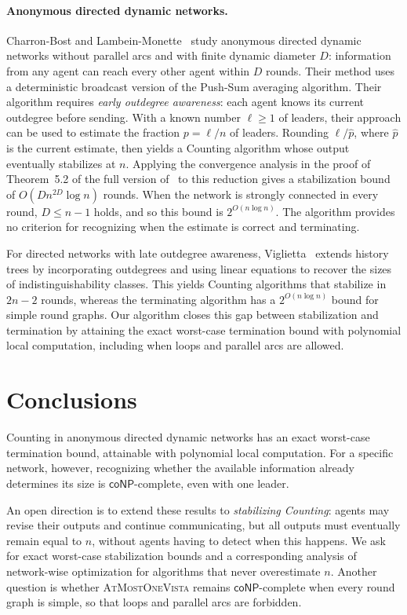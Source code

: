 \documentclass[11pt]{article}
\begin{document}
\paragraph{Anonymous directed dynamic networks.}
Charron-Bost and Lambein-Monette~\cite{CBLM24} study
anonymous directed dynamic networks without parallel arcs and with finite
dynamic diameter \(D\): information from any agent can reach every
other agent within \(D\) rounds.
Their method uses a deterministic broadcast
version of the Push-Sum averaging algorithm.%
Their algorithm requires \emph{early outdegree
awareness}: each agent knows its current outdegree before sending.
With a known number \(\ell\geq1\) of leaders, their approach can be used
to estimate the fraction \(p=\ell/n\) of leaders. Rounding
\(\ell/\widehat p\), where \(\widehat p\) is the current estimate,
then yields a Counting algorithm whose output eventually stabilizes
at \(n\). Applying the convergence analysis in the proof of
Theorem~5.2 of the full version of~\cite{CBLM24} to this reduction gives a
stabilization bound of \(O(Dn^{2D}\log n)\) rounds. When the network
is strongly connected in every round, \(D\leq n-1\) holds, and so this bound
is \(2^{O(n\log n)}\). The algorithm provides no criterion for
recognizing when the estimate is correct and terminating. 

For directed networks with late outdegree awareness, Viglietta~\cite{VIG24} extends
history trees by incorporating outdegrees and using linear equations
to recover the sizes of indistinguishability classes. This yields
Counting algorithms that stabilize in \(2n-2\) rounds, whereas the
terminating algorithm has a \(2^{O(n\log n)}\) bound for simple round
graphs. Our algorithm closes this gap between stabilization and
termination by attaining the exact worst-case termination bound with
polynomial local computation, including
when loops and parallel arcs are allowed.

\section{Conclusions}
\label{sec:conclusions}

Counting in anonymous directed dynamic networks has an exact
worst-case termination bound, attainable with polynomial local
computation. For a specific network, however,
recognizing whether the available information already determines
its size is \(\mathsf{coNP}\)-complete, even with one leader.

An open direction is to extend these results to \emph{stabilizing
Counting}: agents may revise their outputs and continue communicating,
but all outputs must eventually remain equal to \(n\), without agents
having to detect when this happens. We ask for exact worst-case
stabilization bounds and a corresponding analysis of network-wise
optimization for algorithms that never overestimate \(n\).
Another question is whether \textsc{AtMostOneVista} remains
\(\mathsf{coNP}\)-complete when every round graph is simple, so that
loops and parallel arcs are forbidden.
\end{document}
